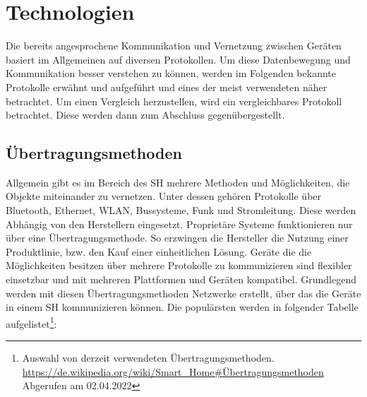 \section{Technologien}
\label{sec:technologien}
    Die bereits angesprochene Kommunikation und Vernetzung zwischen Geräten basiert im Allgemeinen auf 
    diversen Protokollen. Um diese Datenbewegung und Kommunikation besser verstehen zu können, werden im 
    Folgenden bekannte Protokolle erwähnt und aufgeführt und eines der meist verwendeten näher betrachtet. 
    Um einen Vergleich herzustellen, wird ein vergleichbares Protokoll betrachtet. Diese werden dann zum 
    Abschluss gegenübergestellt. 

    \subsection{Übertragungsmethoden}
    \label{subsec:netzwerkprotokolle}
    Allgemein gibt es im Bereich des \acl{SH} mehrere Methoden und Möglichkeiten, die Objekte miteinander zu vernetzen. 
    Unter dessen gehören Protokolle über Bluetooth, Ethernet, WLAN, Bussysteme, Funk und Stromleitung. 
    Diese werden Abhängig von den Herstellern eingesetzt. Proprietäre Systeme funktionieren nur über eine 
    Übertragungsmethode. So erzwingen die Hersteller die Nutzung einer Produktlinie, bzw. den Kauf einer 
    einheitlichen Lösung. Geräte die die Möglichkeiten besitzen über mehrere Protokolle 
    zu kommunizieren sind flexibler einsetzbar und mit mehreren Plattformen und Geräten kompatibel.
    Grundlegend werden mit diesen Übertragungsmethoden Netzwerke erstellt, über das die Geräte in einem \acl{SH} kommunizieren können.
    Die populärsten werden in folgender Tabelle aufgelistet\footnote{Auswahl von derzeit verwendeten Übertragungsmethoden. \url{https://de.wikipedia.org/wiki/Smart_Home\#Übertragungsmethoden} Abgerufen am 02.04.2022}: 
